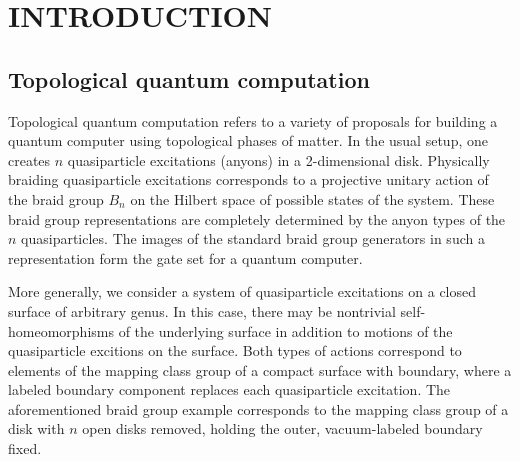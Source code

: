 %
%
%
%



\pagestyle{plain} %
\setcounter{page}{1}


\chapter{\uppercase {Introduction}}


\section{Topological quantum computation}

Topological quantum computation refers to a variety of proposals for building a quantum computer using topological phases of matter.  In the usual setup, one creates $n$ quasiparticle excitations (anyons) in a 2-dimensional disk.  Physically braiding quasiparticle excitations corresponds to a projective unitary action of the braid group $B_n$ on the Hilbert space of possible states of the system.  These braid group representations are completely determined by the anyon types of the $n$ quasiparticles. The images of the standard braid group generators in such a representation form the gate set for a quantum computer.  


More generally, we consider a system of quasiparticle excitations on a closed surface of arbitrary genus.  In this case, there may be nontrivial self-homeomorphisms of the underlying surface in addition to motions of the quasiparticle excitions on the surface.  Both types of actions correspond to elements of the mapping class group of a compact surface with boundary, where a labeled boundary component replaces each quasiparticle excitation. The aforementioned braid group example corresponds to the mapping class group of a disk with $n$ open disks removed, holding the outer, vacuum-labeled boundary fixed.  

